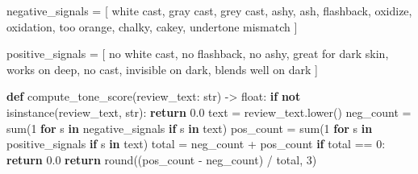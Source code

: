 \documentclass[
  letterpaper,
  DIV=11,
  numbers=noendperiod]{scrartcl}
\newenvironment{Shaded}{\begin{snugshade}}{\end{snugshade}}
\newcommand{\BuiltInTok}[1]{\textcolor[rgb]{0.00,0.23,0.31}{#1}}
\newcommand{\ControlFlowTok}[1]{\textcolor[rgb]{0.00,0.23,0.31}{\textbf{#1}}}
\newcommand{\DecValTok}[1]{\textcolor[rgb]{0.68,0.00,0.00}{#1}}
\newcommand{\FloatTok}[1]{\textcolor[rgb]{0.68,0.00,0.00}{#1}}
\newcommand{\KeywordTok}[1]{\textcolor[rgb]{0.00,0.23,0.31}{\textbf{#1}}}
\newcommand{\NormalTok}[1]{\textcolor[rgb]{0.00,0.23,0.31}{#1}}
\newcommand{\OperatorTok}[1]{\textcolor[rgb]{0.37,0.37,0.37}{#1}}
\newcommand{\StringTok}[1]{\textcolor[rgb]{0.13,0.47,0.30}{#1}}
\begin{document}
\protect{}\label{code-tone-signal}
\begin{Shaded}
\begin{Highlighting}[]
\NormalTok{negative\_signals }\OperatorTok{=}\NormalTok{ [}
    \StringTok{\textquotesingle{}white cast\textquotesingle{}}\NormalTok{, }\StringTok{\textquotesingle{}gray cast\textquotesingle{}}\NormalTok{, }\StringTok{\textquotesingle{}grey cast\textquotesingle{}}\NormalTok{, }\StringTok{\textquotesingle{}ashy\textquotesingle{}}\NormalTok{, }\StringTok{\textquotesingle{}ash\textquotesingle{}}\NormalTok{,}
    \StringTok{\textquotesingle{}flashback\textquotesingle{}}\NormalTok{, }\StringTok{\textquotesingle{}oxidize\textquotesingle{}}\NormalTok{, }\StringTok{\textquotesingle{}oxidation\textquotesingle{}}\NormalTok{, }\StringTok{\textquotesingle{}too orange\textquotesingle{}}\NormalTok{,}
    \StringTok{\textquotesingle{}chalky\textquotesingle{}}\NormalTok{, }\StringTok{\textquotesingle{}cakey\textquotesingle{}}\NormalTok{, }\StringTok{\textquotesingle{}undertone mismatch\textquotesingle{}}
\NormalTok{]}

\NormalTok{positive\_signals }\OperatorTok{=}\NormalTok{ [}
    \StringTok{\textquotesingle{}no white cast\textquotesingle{}}\NormalTok{, }\StringTok{\textquotesingle{}no flashback\textquotesingle{}}\NormalTok{, }\StringTok{\textquotesingle{}no ashy\textquotesingle{}}\NormalTok{,}
    \StringTok{\textquotesingle{}great for dark skin\textquotesingle{}}\NormalTok{, }\StringTok{\textquotesingle{}works on deep\textquotesingle{}}\NormalTok{,}
    \StringTok{\textquotesingle{}no cast\textquotesingle{}}\NormalTok{, }\StringTok{\textquotesingle{}invisible on dark\textquotesingle{}}\NormalTok{, }\StringTok{\textquotesingle{}blends well on dark\textquotesingle{}}
\NormalTok{]}

\KeywordTok{def}\NormalTok{ compute\_tone\_score(review\_text: }\BuiltInTok{str}\NormalTok{) }\OperatorTok{{-}\textgreater{}} \BuiltInTok{float}\NormalTok{:}
    \ControlFlowTok{if} \KeywordTok{not} \BuiltInTok{isinstance}\NormalTok{(review\_text, }\BuiltInTok{str}\NormalTok{):}
        \ControlFlowTok{return} \FloatTok{0.0}
\NormalTok{    text }\OperatorTok{=}\NormalTok{ review\_text.lower()}
\NormalTok{    neg\_count }\OperatorTok{=} \BuiltInTok{sum}\NormalTok{(}\DecValTok{1} \ControlFlowTok{for}\NormalTok{ s }\KeywordTok{in}\NormalTok{ negative\_signals }\ControlFlowTok{if}\NormalTok{ s }\KeywordTok{in}\NormalTok{ text)}
\NormalTok{    pos\_count }\OperatorTok{=} \BuiltInTok{sum}\NormalTok{(}\DecValTok{1} \ControlFlowTok{for}\NormalTok{ s }\KeywordTok{in}\NormalTok{ positive\_signals }\ControlFlowTok{if}\NormalTok{ s }\KeywordTok{in}\NormalTok{ text)}
\NormalTok{    total }\OperatorTok{=}\NormalTok{ neg\_count }\OperatorTok{+}\NormalTok{ pos\_count}
    \ControlFlowTok{if}\NormalTok{ total }\OperatorTok{==} \DecValTok{0}\NormalTok{:}
        \ControlFlowTok{return} \FloatTok{0.0}
    \ControlFlowTok{return} \BuiltInTok{round}\NormalTok{((pos\_count }\OperatorTok{{-}}\NormalTok{ neg\_count) }\OperatorTok{/}\NormalTok{ total, }\DecValTok{3}\NormalTok{)}
\end{Highlighting}
\end{Shaded}
\end{document}
